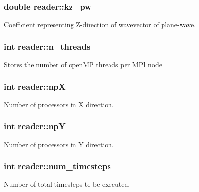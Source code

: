 \subsubsection[{\texorpdfstring{kz\+\_\+pw}{kz_pw}}]{\setlength{\rightskip}{0pt plus 5cm}double reader\+::kz\+\_\+pw}\hypertarget{classreader_ab1473fac73efae3f8317fc290d4a1f52}{}\label{classreader_ab1473fac73efae3f8317fc290d4a1f52}
Coefficient representing Z-\/direction of wavevector of plane-\/wave. 
\subsubsection[{\texorpdfstring{n\+\_\+threads}{n_threads}}]{\setlength{\rightskip}{0pt plus 5cm}int reader\+::n\+\_\+threads}\hypertarget{classreader_a99cc611dcacff82a10bc64af27846d67}{}\label{classreader_a99cc611dcacff82a10bc64af27846d67}
Stores the number of open\+MP threads per M\+PI node. 
\subsubsection[{\texorpdfstring{npX}{npX}}]{\setlength{\rightskip}{0pt plus 5cm}int reader\+::npX}\hypertarget{classreader_aee211b49773f5df67ee1c9e97571233f}{}\label{classreader_aee211b49773f5df67ee1c9e97571233f}
Number of processors in X direction. 
\subsubsection[{\texorpdfstring{npY}{npY}}]{\setlength{\rightskip}{0pt plus 5cm}int reader\+::npY}\hypertarget{classreader_a1c0a1faf8270b0ee3bc10587e333aee2}{}\label{classreader_a1c0a1faf8270b0ee3bc10587e333aee2}
Number of processors in Y direction. 
\subsubsection[{\texorpdfstring{num\+\_\+timesteps}{num_timesteps}}]{\setlength{\rightskip}{0pt plus 5cm}int reader\+::num\+\_\+timesteps}\hypertarget{classreader_ae4cc3c397b3374a3f44d674cbe07b02d}{}\label{classreader_ae4cc3c397b3374a3f44d674cbe07b02d}
Number of total timesteps to be executed. 
